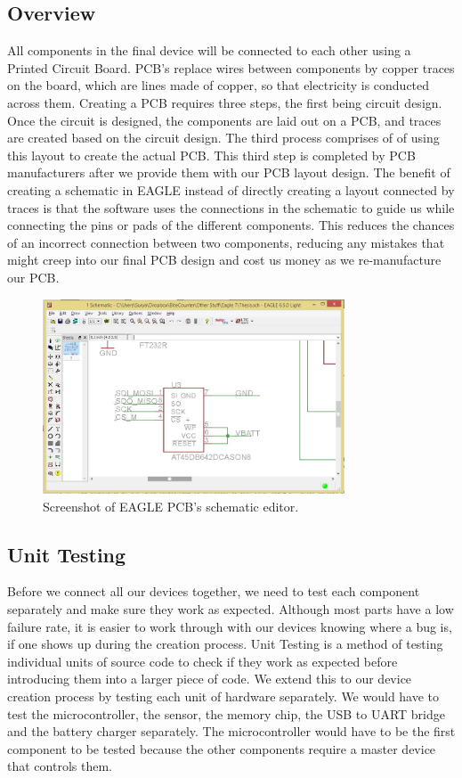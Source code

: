 \subsection{Overview}
\label{Sec:PCBDesign}
All components in the final device will be connected to each other using a Printed Circuit Board.
PCB's replace wires between components by copper traces on the board,
which are lines made of copper, so that electricity is conducted across them.
Creating a PCB requires three steps, the first being circuit design.
Once the circuit is designed, the components are laid out on a PCB, and traces are created based on the circuit design.
The third process comprises of of using this layout to create the actual PCB.
This third step is completed by PCB manufacturers after we provide them with our PCB layout design.
The benefit of creating a schematic in EAGLE instead of directly creating a layout connected by traces
is that the software uses the connections in the schematic to guide us while connecting the pins or pads of the different components.
This reduces the chances of an incorrect connection between two components,
reducing any mistakes that might creep into our final PCB design and cost us money as we re-manufacture our PCB.
\begin{figure}
\begin{center}
\includegraphics[width=0.8\textwidth]{images/EagleScreen.jpg}
\caption{Screenshot of EAGLE PCB's schematic editor.}
\label{Fig:EaglePCBScreen}
\end{center}
\end{figure}

\subsection{Unit Testing}
\label{Sec:UnitTesting}
Before we connect all our devices together,
we need to test each component separately and make sure they work as expected.
Although most parts have a low failure rate,
it is easier to work through with our devices knowing where a bug is,
if one shows up during the creation process.
Unit Testing is a method of testing individual units of source code to check if they work as expected before introducing them into a larger piece of code.
We extend this to our device creation process by testing each unit of hardware separately.
We would have to test the microcontroller, the sensor, the memory chip, the USB to UART bridge and the battery charger separately.
The microcontroller would have to be the first component to be tested because the other components require a master device that controls them.

